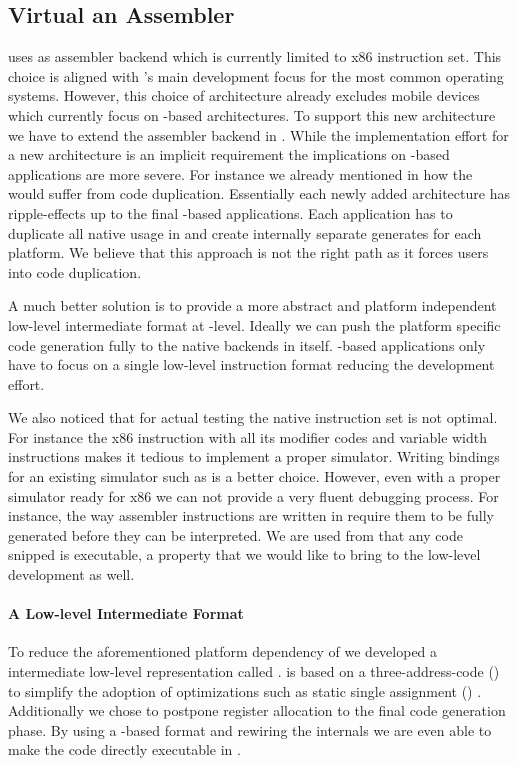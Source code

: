 \subsection{Virtual \CPU an Assembler \DSL}
\B uses \AsmJIT as assembler backend which is currently limited to x86 instruction set.
This choice is aligned with \PH's main development focus for the most common operating systems.
However, this choice of architecture already excludes mobile devices which currently focus on \ARM-based architectures.
To support this new architecture we have to extend the assembler backend in \AsmJIT.
While the implementation effort for a new \AsmJIT architecture is an implicit requirement the implications on \B-based applications are more severe.
For instance we already mentioned in  how the \NB \FFI would suffer from code duplication.
Essentially each newly added \CPU architecture has ripple-effects up to the final \B-based applications.
Each \B application has to duplicate all native usage in and create internally separate generates for each platform.
We believe that this approach is not the right path as it forces \B users into code duplication.

A much better solution is to provide a more abstract and platform independent low-level intermediate format at \B-level.
Ideally we can push the platform specific code generation fully to the native backends in \B itself.
\B-based applications only have to focus on a single low-level instruction format reducing the development effort.


We also noticed that for actual testing the native instruction set is not optimal.
For instance the x86 instruction with all its modifier codes and variable width instructions makes it tedious to implement a proper simulator.
Writing bindings for an existing simulator such as  is a better choice.
However, even with a proper simulator ready for x86 we can not provide a very fluent debugging process.
For instance, the way assembler instructions are written in \B require them to be fully generated before they can be interpreted.
We are used from \PH that any code snipped is executable, a property that we would like to bring to the low-level development as well.


\paragraph{A Low-level Intermediate Format}
To reduce the aforementioned platform dependency of \B we developed a intermediate low-level representation called \VCPU.
\VCPU is based on a three-address-code (\TAC) to simplify the adoption of optimizations such as static single assignment (\SSA) \cite{??}.
Additionally we chose to postpone register allocation to the final code generation phase.
By using a \TAC-based format and rewiring the internals we are even able to make the \VCPU code directly executable in \PH.

